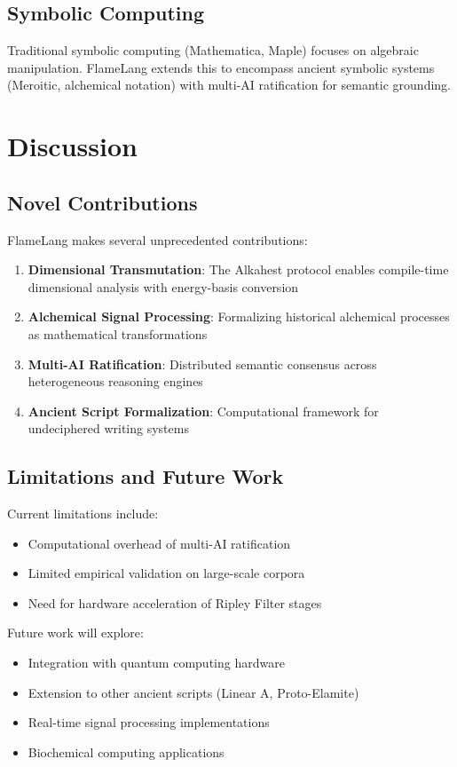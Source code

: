 \documentclass[11pt,a4paper]{article}
\begin{document}
\subsection{Symbolic Computing}

Traditional symbolic computing (Mathematica, Maple) focuses on algebraic manipulation. FlameLang extends this to encompass ancient symbolic systems (Meroitic, alchemical notation) with multi-AI ratification for semantic grounding.

\section{Discussion}

\subsection{Novel Contributions}

FlameLang makes several unprecedented contributions:

\begin{enumerate}
\item \textbf{Dimensional Transmutation}: The Alkahest protocol enables compile-time dimensional analysis with energy-basis conversion
\item \textbf{Alchemical Signal Processing}: Formalizing historical alchemical processes as mathematical transformations
\item \textbf{Multi-AI Ratification}: Distributed semantic consensus across heterogeneous reasoning engines
\item \textbf{Ancient Script Formalization}: Computational framework for undeciphered writing systems
\end{enumerate}

\subsection{Limitations and Future Work}

Current limitations include:
\begin{itemize}
\item Computational overhead of multi-AI ratification
\item Limited empirical validation on large-scale corpora
\item Need for hardware acceleration of Ripley Filter stages
\end{itemize}

Future work will explore:
\begin{itemize}
\item Integration with quantum computing hardware
\item Extension to other ancient scripts (Linear A, Proto-Elamite)
\item Real-time signal processing implementations
\item Biochemical computing applications
\end{itemize}
\end{document}
